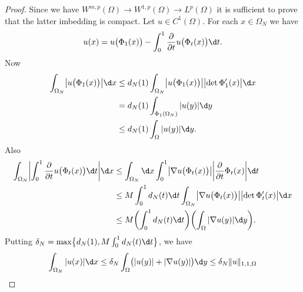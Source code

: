 \begin{proof}
  Since we have $W^{m,p}(\Omega) \to W^{1,p}(\Omega) \to L^p(\Omega)$
  it is sufficient to prove that the latter imbedding is compact.
  Let $u\in C^1(\Omega)$. For each $x\in\Omega_N$ we have
  \[ u(x) = u\bigl(\Phi_1(x)\bigr)
      - \int_0^1 \frac{\partial}{\partial t} u\bigl(\Phi_t(x)\bigr) \d t. \]
  Now
  \begin{align*}
    \int_{\Omega_N} \bigl|u\bigl(\Phi_1(x)\bigr)\bigr| \d x
    & \leq d_N(1) \int_{\Omega_N} \bigl|u\bigl(\Phi_1(x)\bigr)\bigr|
        \bigl|\det\Phi_1'(x)\bigr| \d x \\
    & = d_N(1) \int_{\Phi_1(\Omega_N)} |u(y)| \d y \\
    & \leq d_N(1) \int_{\Omega} |u(y)| \d y.
  \end{align*}
  Also
  \begin{align*}
    \int_{\Omega_N} \biggl|\int_0^1 \frac{\partial}{\partial t} u\bigl(\Phi_t(x)\bigr) \d t \biggr| \d x
    & \leq \int_{\Omega_N} \d x \int_0^1 \bigl|\nabla u\bigl(\Phi_t(x)\bigr)\bigr|
        \biggl|\frac{\partial}{\partial t} \Phi_t(x)\biggr| \d t \\
    & \leq M \int_0^1 d_N(t) \d t \int_{\Omega_N} \bigl|\nabla u\bigl(\Phi_t(x)\bigr)\bigr|
        \bigl|\det\Phi_t'(x)\bigr| \d x \\
    & \leq M\biggl(\int_0^1 d_N(t) \d t\biggr) \biggl(\int_{\Omega} |\nabla u(y)| \d y\biggr).
  \end{align*}
  Putting $\delta_N = \max\bigl\{d_N(1), M \int_0^1 d_N(t)\d t\bigr\}$, we have
  \begin{equation}\label{eq:6.30}
    \int_{\Omega_N} |u(x)| \d x
    \leq \delta_N \int_{\Omega} \bigl(|u(y)| + |\nabla u(y)|\bigr) \d y
    \leq \delta_N \|u\|_{1,1,\Omega}
  \end{equation}
\end{proof}